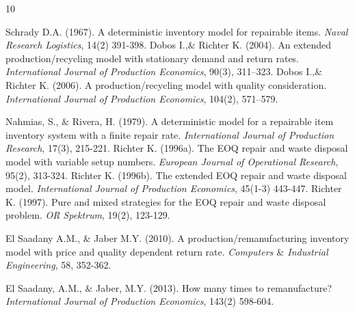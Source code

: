 \documentclass[11pt]{article}
\begin{document}
 \begin{thebibliography}{10}

  {Schrady D.A.} (1967).
 A deterministic inventory model for repairable items. {\it Naval Research Logistics}, 14(2) 391-398.
  {Dobos I.,$\&$ Richter K.} (2004). An extended production/recycling model with stationary demand and return rates. {\it International Journal of Production Economics}, 90(3), 311–323. 
  {Dobos I.,$\&$ Richter K.} (2006). A production/recycling model with quality consideration. {\it International Journal of Production Economics}, 104(2), 571–579.


  {Nahmias, S., $\&$ Rivera, H.} (1979).
 A deterministic model for a repairable item inventory system with a finite repair rate. {\it International Journal of Production Research}, 17(3), 215-221.
 {Richter K.} (1996a). The EOQ repair and waste disposal model with variable setup numbers. {\it European Journal of Operational Research}, 95(2), 313-324.
  {Richter K.} (1996b).
 The extended EOQ repair and waste disposal model. {\it International Journal of Production Economics}, 45(1-3) 443-447.
  {Richter K.} (1997).
 Pure and mixed strategies for the EOQ repair and waste disposal problem. {\it OR Spektrum}, 19(2), 123-129.
 

 {El Saadany A.M., $\&$ Jaber M.Y.} (2010).
 A production/remanufacturing inventory model with price and quality dependent return rate. {\it Computers $\&$ Industrial Engineering}, 58, 352-362.

 {El Saadany, A.M., $\&$ Jaber, M.Y.} (2013). How many times to remanufacture? {\it  International Journal of Production Economics}, 143(2)  598-604.


\end{thebibliography}
\end{document}
